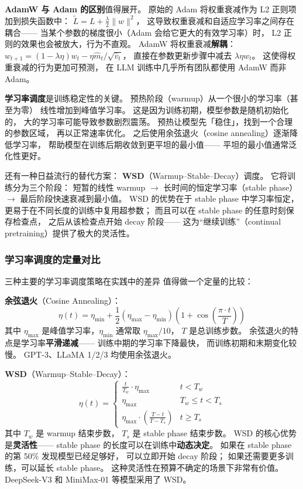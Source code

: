 \textbf{AdamW 与 Adam 的区别}值得展开。
原始的 Adam 将权重衰减作为 L2 正则项加到损失函数中：
$\tilde{L} = L + \frac{\lambda}{2}\|w\|^2$，
这导致权重衰减和自适应学习率之间存在耦合——
当某个参数的梯度很小（Adam 会给它更大的有效学习率）时，
L2 正则的效果也会被放大，行为不直观。
AdamW 将权重衰减\textbf{解耦}：
$w_{t+1} = (1 - \lambda \eta) w_t - \eta \hat{m}_t / \sqrt{\hat{v}_t}$，
直接在参数更新步骤中减去 $\lambda \eta w_t$。
这使得权重衰减的行为更加可预测，
在 LLM 训练中几乎所有团队都使用 AdamW 而非 Adam。

\textbf{学习率调度}是训练稳定性的关键。
预热阶段（warmup）从一个很小的学习率（甚至为零）
线性增加到峰值学习率。
这是因为训练初期，模型参数是随机初始化的，
大的学习率可能导致参数剧烈震荡。
预热让模型先「稳住」，找到一个合理的参数区域，
再以正常速率优化。
之后使用余弦退火（cosine annealing）逐渐降低学习率，
帮助模型在训练后期收敛到更平坦的最小值——
平坦的最小值通常泛化性更好。

还有一种日益流行的替代方案：
\textbf{WSD}（Warmup--Stable--Decay）调度。
它将训练分为三个阶段：
短暂的线性 warmup $\to$
长时间的恒定学习率（stable phase）$\to$
最后阶段快速衰减到最小值。
WSD 的优势在于 stable phase 中学习率恒定，
更易于在不同长度的训练中复用超参数；
而且可以在 stable phase 的任意时刻保存检查点，
之后从该检查点开始 decay 阶段——
这为``继续训练''（continual pretraining）提供了极大的灵活性。

\subsubsection{学习率调度的定量对比}

三种主要的学习率调度策略在实践中的差异
值得做一个定量的比较：

\textbf{余弦退火}（Cosine Annealing）：
\begin{equation}
  \eta(t) = \eta_{\min} + \frac{1}{2}(\eta_{\max} - \eta_{\min})
  \left(1 + \cos\left(\frac{\pi \cdot t}{T}\right)\right)
\end{equation}
其中 $\eta_{\max}$ 是峰值学习率，$\eta_{\min}$ 通常取 $\eta_{\max}/10$，
$T$ 是总训练步数。
余弦退火的特点是学习率\textbf{平滑递减}——
训练中期的学习率下降最快，
而训练初期和末期变化较慢。
GPT-3、LLaMA 1/2/3 均使用余弦退火。

\textbf{WSD}（Warmup--Stable--Decay）：
\begin{equation}
  \eta(t) = \begin{cases}
    \frac{t}{T_w} \cdot \eta_{\max} & t < T_w \\
    \eta_{\max} & T_w \leq t < T_s \\
    \eta_{\max} \cdot \left(\frac{T - t}{T - T_s}\right) & t \geq T_s
  \end{cases}
\end{equation}
其中 $T_w$ 是 warmup 结束步数，
$T_s$ 是 stable phase 结束步数。
WSD 的核心优势是\textbf{灵活性}——
stable phase 的长度可以在训练中\textbf{动态决定}。
如果在 stable phase 的第 50\% 发现模型已经足够好，
可以立即开始 decay 阶段；
如果还需要更多训练，可以延长 stable phase。
这种灵活性在预算不确定的场景下非常有价值。
DeepSeek-V3 和 MiniMax-01 等模型采用了 WSD。

